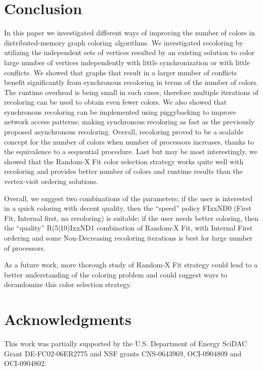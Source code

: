 \documentclass{article}
\begin{document}
\section{Conclusion}
\label{sec:ccl}

In this paper we investigated different ways of
improving the number of colors in distributed-memory graph coloring
algorithms. We investigated recoloring by
utilizing the independent sets of vertices resulted by an existing
solution to color large number of vertices independently with little
synchronization or with little conflicts. We showed that graphs that
result in a larger number of conflicts benefit significantly from synchronous
recoloring in terms of the number of colors. The runtime overhead
is being small in such cases, therefore multiple iterations of recoloring can be
used to obtain even fewer colors. We also showed
that synchronous recoloring can be implemented using piggybacking to
improve network access patterns; making synchronous recoloring as fast
as the previously proposed asynchronous recoloring.
Overall, recoloring proved to be a scalable concept
for the number of colors when number of processors increases, thanks
to the equivalence to a sequential procedure.
Last but may be most interestingly, we showed that the Random-X Fit color 
selection strategy works quite well with recoloring and provides
better number of colors and runtime results than the vertex-visit
ordering solutions.

Overall, we suggest
two combinations of the parameters; if the user is interested in a quick
coloring with decent quality, then the ``speed'' policy FIxxND0 (First Fit, Internal first, no recoloring)
is suitable; if the user needs better coloring, then the ``quality'' R(5|10)IxxND1
combination of Random-X Fit, with Internal First ordering and some
Non-Decreasing recoloring iterations is best for large number of processors. 

As a future work, more thorough study of Random-X Fit strategy
could lead to a better understanding of the coloring problem and could
suggest ways to derandomize this color selection strategy.

\section*{Acknowledgments}
This work was partially supported by the U.S. Department of Energy SciDAC Grant
DE-FC02-06ER2775 and NSF grants CNS-0643969, OCI-0904809 and OCI-0904802.




\end{document}
